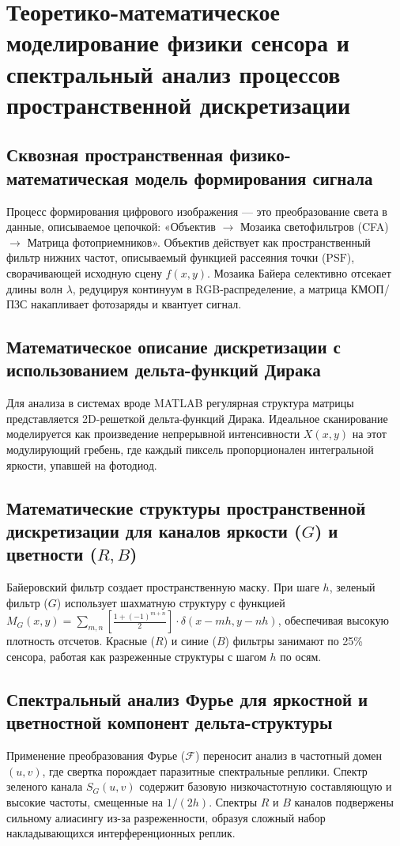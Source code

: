 \documentclass[12pt,a4paper]{article}
\begin{document}
\section{Теоретико-математическое моделирование физики сенсора и спектральный анализ процессов пространственной дискретизации}

\subsection{Сквозная пространственная физико-математическая модель формирования сигнала}
Процесс формирования цифрового изображения — это преобразование света в данные, описываемое цепочкой: «Объектив $\to$ Мозаика светофильтров (CFA) $\to$ Матрица фотоприемников». Объектив действует как пространственный фильтр нижних частот, описываемый функцией рассеяния точки ($\text{PSF}$), сворачивающей исходную сцену $f(x, y)$. Мозаика Байера селективно отсекает длины волн $\lambda$, редуцируя континуум в RGB-распределение, а матрица КМОП/ПЗС накапливает фотозаряды и квантует сигнал.

\subsection{Математическое описание дискретизации с использованием дельта-функций Дирака}
Для анализа в системах вроде MATLAB регулярная структура матрицы представляется 2D-решеткой дельта-функций Дирака. Идеальное сканирование моделируется как произведение непрерывной интенсивности $X(x, y)$ на этот модулирующий гребень, где каждый пиксель пропорционален интегральной яркости, упавшей на фотодиод.

\subsection{Математические структуры пространственной дискретизации для каналов яркости ($G$) и цветности ($R, B$)}
Байеровский фильтр создает пространственную маску. При шаге $h$, зеленый фильтр ($G$) использует шахматную структуру с функцией $M_G(x, y) = \sum_{m,n} \left[ \frac{1 + (-1)^{m+n}}{2} \right] \cdot \delta(x - mh, y - nh)$, обеспечивая высокую плотность отсчетов. Красные ($R$) и синие ($B$) фильтры занимают по 25\% сенсора, работая как разреженные структуры с шагом $h$ по осям.

\subsection{Спектральный анализ Фурье для яркостной и цветностной компонент дельта-структуры}
Применение преобразования Фурье ($\mathcal{F}$) переносит анализ в частотный домен $(u, v)$, где свертка порождает паразитные спектральные реплики. Спектр зеленого канала $S_G(u, v)$ содержит базовую низкочастотную составляющую и высокие частоты, смещенные на $1/(2h)$. Спектры $R$ и $B$ каналов подвержены сильному алиасингу из-за разреженности, образуя сложный набор накладывающихся интерференционных реплик.
\end{document}
